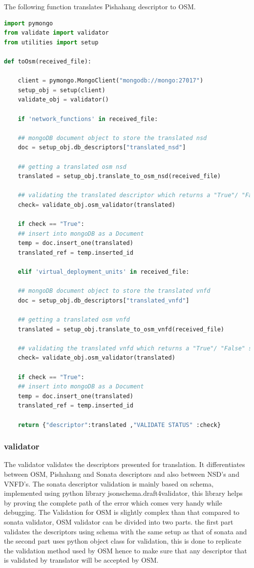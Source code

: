 \pagebreak

The following function translates Pishahang descriptor to OSM.
\begin{lstlisting}[language=Python]
import pymongo
from validate import validator
from utilities import setup

def toOsm(received_file):

	client = pymongo.MongoClient("mongodb://mongo:27017")
	setup_obj = setup(client)
	validate_obj = validator()
	
	if 'network_functions' in received_file:
	
	## mongoDB document object to store the translated nsd
	doc = setup_obj.db_descriptors["translated_nsd"]
	
	## getting a translated osm nsd
	translated = setup_obj.translate_to_osm_nsd(received_file)
	
	## validating the translated descriptor which returns a "True"/ "False" string
	check= validate_obj.osm_validator(translated)
	
	if check == "True":
	## insert into mongoDB as a Document
	temp = doc.insert_one(translated)
	translated_ref = temp.inserted_id
	
	elif 'virtual_deployment_units' in received_file:
	
	## mongoDB document object to store the translated vnfd
	doc = setup_obj.db_descriptors["translated_vnfd"]
	
	## getting a translated osm vnfd
	translated = setup_obj.translate_to_osm_vnfd(received_file)
	
	## validating the translated vnfd which returns a "True"/ "False" string
	check= validate_obj.osm_validator(translated)
	
	if check == "True":
	## insert into mongoDB as a Document
	temp = doc.insert_one(translated)
	translated_ref = temp.inserted_id
	
	return {"descriptor":translated ,"VALIDATE STATUS" :check}
\end{lstlisting}

\subsubsection{validator}

The validator validates the descriptors presented for translation. It differentiates between OSM, Pishahang and Sonata descriptors and also between NSD's and VNFD's. The sonata descriptor validation is mainly based on schema, implemented using python library jsonschema.draft4validator, this library helps by proving the complete path of the error which comes very handy while debugging. The Validation for OSM is slightly complex than that compared to sonata validator, OSM validator can be divided into two parts. the first part validates the descriptors using schema with the same setup as that of sonata and the second part uses python object class for validation, this is done to replicate the validation method used by OSM hence to make sure that any descriptor that is validated by translator will be accepted by OSM.

